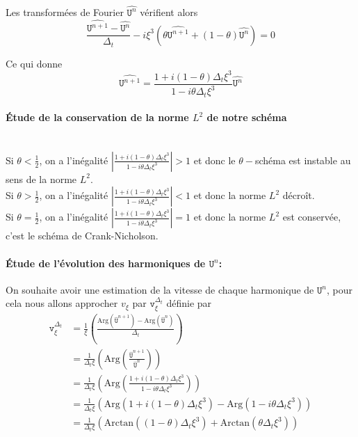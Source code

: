 \documentclass[12pt,a4paper]{article}
\numberwithin{equation}{section}
\begin{document}
Les transformées de Fourier $\widehat{\texttt{U}^n}$ vérifient alors
\begin{equation*}
\frac{\widehat{\texttt{U}^{n+1}}-\widehat{\texttt{U}^n}}{\Delta_t} - i \xi^3(\theta\widehat{\texttt{U}^{n+1}} + (1-\theta)\widehat{\texttt{U}^{n}}) = 0 
\end{equation*}

Ce qui donne 
\begin{equation*}
\widehat{\texttt{U}^{n+1}} = \frac{1 + i (1-\theta)\Delta_t\xi^3}{1 - i\theta \Delta_t\xi^3 }\widehat{\texttt{U}^{n}}  
\end{equation*}

\paragraph{Étude de la conservation de la norme $L^2$ de notre schéma}\,
\\

Si $\theta < \frac{1}{2}$, on a l'inégalité $\left|\frac{1 + i (1-\theta)\Delta_t\xi^3}{1 - i\theta \Delta_t\xi^3 }\right|>1 $  et donc le $\theta-$schéma est instable au sens de la norme $L^2$.\\

Si $\theta > \frac{1}{2}$, on a l'inégalité $\left|\frac{1 + i (1-\theta)\Delta_t\xi^3}{1 - i\theta \Delta_t\xi^3 }\right|<1 $ et donc la norme $L^2$ décroît.\\

Si $\theta = \frac{1}{2}$, on a l'inégalité $\left|\frac{1 + i (1-\theta)\Delta_t\xi^3}{1 - i\theta \Delta_t\xi^3 }\right| = 1$ et donc la norme $L^2$ est conservée, c'est le schéma de Crank-Nicholson.\\

\paragraph{Étude de l'évolution des harmoniques de $\texttt{U}^n$:} 
On souhaite avoir une estimation de la vitesse de chaque harmonique de $\texttt{U}^n$, pour cela nous allons approcher $v_\xi$ par $ \texttt{v}_\xi^{\Delta_t}$ définie par
\begin{equation}
\begin{split}
     \texttt{v}_\xi^{\Delta_t} &= \frac{1}{\xi}\left( \frac{\text{Arg}(\widehat{\texttt{U}}^{n+1}) - \text{Arg}(\widehat{\texttt{U}}^{n})}{\Delta_t} \right)
    \\ & =\frac{1}{\Delta_t\xi}\left(\text{Arg}\left( \frac{\widehat{\texttt{U}}^{n+1}}{\widehat{\texttt{U}}^{n}}\right)\right) 
    \\ & = \frac{1}{\Delta_t\xi}\left(\text{Arg}\left(\frac{1 + i (1-\theta)\Delta_t\xi^3}{1 - i\theta \Delta_t\xi^3 }\right)\right)
    \\ & = \frac{1}{\Delta_t\xi}\left(\text{Arg}\left(1 + i (1-\theta)\Delta_t\xi^3\right)- \text{Arg}\left(1 - i\theta \Delta_t\xi^3 \right)\right)
    \\ & = \frac{1}{\Delta_t\xi}\left(\text{Arctan}((1-\theta)\Delta_t\xi^3)+\text{Arctan}(\theta\Delta_t\xi^3)\right)
\end{split}
\end{equation}
\end{document}
